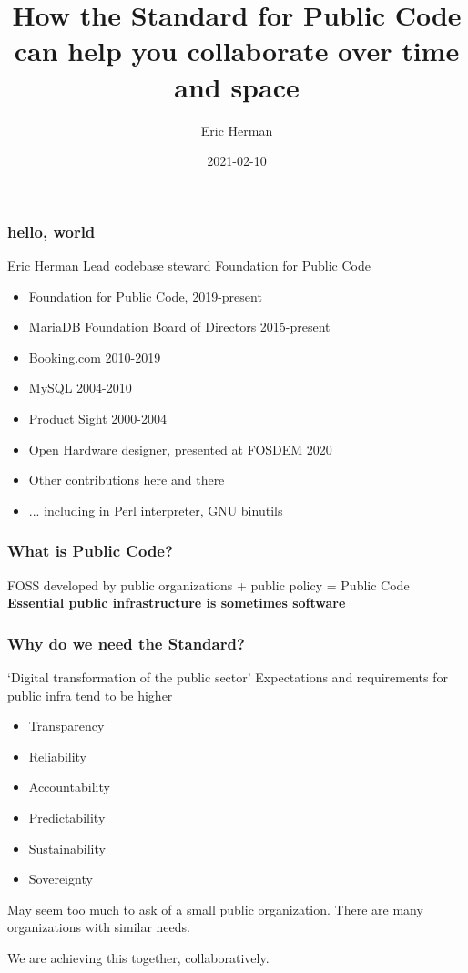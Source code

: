 \documentclass{beamer}
\title{How the Standard for Public Code can help you collaborate over time and space}
\author{Eric Herman}
\institute{Foundation for Public Code}
\date{2021-02-10}
\begin{document}
\frame{\titlepage}

\begin{frame}
\frametitle{hello, world}
Eric Herman\newline
Lead codebase steward\newline
Foundation for Public Code
\begin{itemize}
\item Foundation for Public Code, 2019-present
\item MariaDB Foundation Board of Directors 2015-present
\item Booking.com 2010-2019
\item MySQL 2004-2010
\item Product Sight 2000-2004
\item Open Hardware designer, presented at FOSDEM 2020
\item Other contributions here and there
\item ... including in Perl interpreter, GNU binutils
\end{itemize}
\end{frame}

\begin{frame}
\frametitle{What is Public Code?}
\huge{ FOSS developed by public organizations }\newline
\huge{ + public policy }\newline
\huge{ = Public Code }\newline\newline
\textbf{Essential public infrastructure is sometimes software}
\end{frame}

\begin{frame}
\frametitle{Why do we need the Standard?}
`Digital transformation of the public sector'\newline\newline
Expectations and requirements for public infra tend to be higher
\begin{itemize}
\item Transparency
\item Reliability
\item Accountability
\item Predictability
\item Sustainability
\item Sovereignty\newline
\end{itemize}
May seem too much to ask of a small public organization.\newline
There are many organizations with similar needs.\newline

We are achieving this together, collaboratively.
\end{frame}
\end{document}
